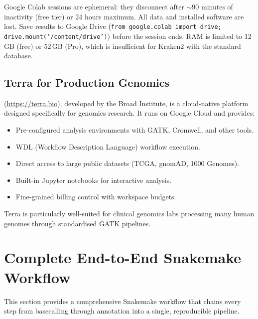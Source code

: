 \begin{warningbox}[title={Colab Limitations}]
Google Colab sessions are ephemeral: they disconnect after $\sim$90 minutes of inactivity (free tier) or 24 hours maximum. All data and installed software are lost. Save results to Google Drive (\texttt{from google.colab import drive; drive.mount('/content/drive')}) before the session ends. RAM is limited to 12\,GB (free) or 52\,GB (Pro), which is insufficient for Kraken2 with the standard database.
\end{warningbox}

\subsection{Terra for Production Genomics}
\label{subsec:diyanalysis:terra}

 (\url{https://terra.bio}), developed by the Broad Institute, is a cloud-native platform designed specifically for genomics research. It runs on Google Cloud and provides:
\begin{itemize}[nosep]
  \item Pre-configured analysis environments with GATK, Cromwell, and other tools.
  \item WDL (Workflow Description Language) workflow execution.
  \item Direct access to large public datasets (TCGA, gnomAD, 1000 Genomes).
  \item Built-in Jupyter notebooks for interactive analysis.
  \item Fine-grained billing control with workspace budgets.
\end{itemize}

Terra is particularly well-suited for clinical genomics labs processing many human genomes through standardised GATK pipelines.

\section{Complete End-to-End Snakemake Workflow}
\label{sec:diyanalysis:full_snakemake}

This section provides a comprehensive Snakemake workflow that chains every step from basecalling through annotation into a single, reproducible pipeline.

